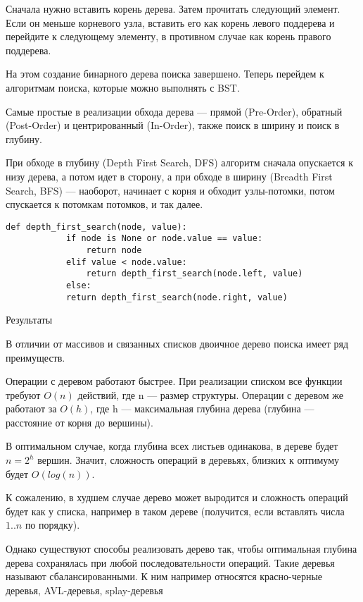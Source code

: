 \documentclass[oneside,14pt]{extarticle} %
\begin{document}
	Сначала нужно вставить корень дерева.
	Затем прочитать следующий элемент. Если он меньше корневого узла, вставить его как корень левого поддерева и перейдите к следующему элементу, в противном случае как корень правого поддерева.
	
	На этом создание бинарного дерева поиска завершено. Теперь перейдем к алгоритмам поиска, которые можно выполнять с BST.
	
	Самые простые в реализации обхода дерева — прямой (Pre-Order), обратный (Post-Order) и центрированный (In-Order), также поиск в ширину и поиск в глубину.
	
	При обходе в глубину (Depth First Search, DFS) алгоритм сначала опускается к низу дерева, а потом идет в сторону, а при обходе в ширину (Breadth First Search, BFS) — наоборот, начинает с корня и обходит узлы-потомки, потом спускается к потомкам потомков, и так далее.
	
	\begin{lstlisting}[caption={Алгоритм поиска в глубину}]
		def depth_first_search(node, value):
			if node is None or node.value == value:
				return node
			elif value < node.value:
				return depth_first_search(node.left, value)
			else:
			return depth_first_search(node.right, value)
	\end{lstlisting}
	
	
	\begin{center}
		Результаты
	\end{center}
		
	В отличии от массивов и связанных списков двоичное дерево поиска имеет ряд преимуществ.

	Операции с деревом работают быстрее. При реализации списком все функции требуют $O(n)$ действий, где n — размер структуры. Операции с деревом же работают за $O(h)$, где h — максимальная глубина дерева (глубина — расстояние от корня до вершины). 
	
	В оптимальном случае, когда глубина всех листьев одинакова, в дереве будет $n=2^h$ вершин. Значит, сложность операций в деревьях, близких к оптимуму будет $O(log(n))$. 
	
	К сожалению, в худшем случае дерево может выродится и сложность операций будет как у списка, например в таком дереве (получится, если вставлять числа $1..n$ по порядку).
	
	Однако существуют способы реализовать дерево так, чтобы оптимальная глубина дерева сохранялась при любой последовательности операций. Такие деревья называют сбалансированными. К ним например относятся красно-черные деревья, AVL-деревья, splay-деревья
	
\end{document}
